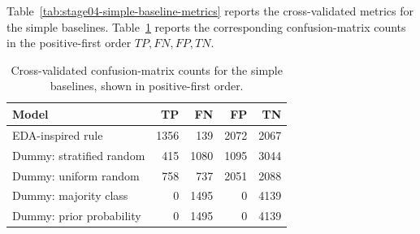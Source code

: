 Table~\ref{tab:stage04-simple-baseline-metrics} reports the cross-validated metrics for the simple baselines. Table~\ref{tab:stage04-simple-baseline-confusion} reports the corresponding confusion-matrix counts in the positive-first order \(TP,FN,FP,TN\).

\begin{table}[H]
\centering
\caption{Cross-validated simple-baseline metrics on the training set.}
\label{tab:stage04-simple-baseline-metrics}
\end{table}

\begin{table}[H]
\centering
\caption{Cross-validated confusion-matrix counts for the simple baselines, shown in positive-first order.}
\label{tab:stage04-simple-baseline-confusion}
\begin{tabular}{lrrrr}
\toprule
Model & TP & FN & FP & TN \\
\midrule
EDA-inspired rule & 1356 & 139 & 2072 & 2067 \\
Dummy: stratified random & 415 & 1080 & 1095 & 3044 \\
Dummy: uniform random & 758 & 737 & 2051 & 2088 \\
Dummy: majority class & 0 & 1495 & 0 & 4139 \\
Dummy: prior probability & 0 & 1495 & 0 & 4139 \\
\bottomrule
\end{tabular}
\end{table}

